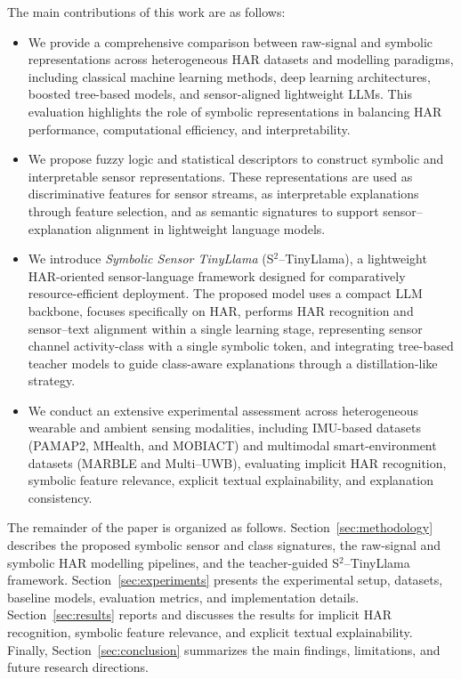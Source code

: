 \documentclass[preprint,12pt]{elsarticle}
\begin{document}
The main contributions of this work are as follows:
\begin{itemize}
    
    \item We provide a comprehensive comparison between raw-signal and symbolic representations across heterogeneous HAR datasets and modelling paradigms, including classical machine learning methods, deep learning architectures, boosted tree-based models, and sensor-aligned lightweight LLMs. This evaluation highlights the role of symbolic representations in balancing HAR performance, computational efficiency, and interpretability.

    \item We propose fuzzy logic and statistical descriptors to construct symbolic and interpretable sensor representations. These representations are used as discriminative features for sensor streams, as interpretable explanations through feature selection, and as semantic signatures to support sensor--explanation alignment in lightweight language models.
    
    \item We introduce \emph{Symbolic Sensor TinyLlama} (S$^2$--TinyLlama), a lightweight HAR-oriented sensor-language framework designed for comparatively resource-efficient deployment. The proposed model uses a compact LLM backbone, focuses specifically on HAR, performs HAR recognition and sensor--text alignment within a single learning stage, representing  sensor channel activity-class with a single symbolic token, and integrating tree-based teacher models to guide class-aware explanations through a distillation-like strategy.
    
    \item We conduct an extensive experimental assessment across heterogeneous wearable and ambient sensing modalities, including IMU-based datasets (PAMAP2, MHealth, and MOBIACT) and multimodal smart-environment datasets (MARBLE and Multi--UWB), evaluating implicit HAR recognition, symbolic feature relevance, explicit textual explainability, and explanation consistency.
\end{itemize}

The remainder of the paper is organized as follows. Section~\ref{sec:methodology} describes the proposed symbolic sensor and class signatures, the raw-signal and symbolic HAR modelling pipelines, and the teacher-guided S$^2$--TinyLlama framework. Section~\ref{sec:experiments} presents the experimental setup, datasets, baseline models, evaluation metrics, and implementation details. Section~\ref{sec:results} reports and discusses the results for implicit HAR recognition, symbolic feature relevance, and explicit textual explainability. Finally, Section~\ref{sec:conclusion} summarizes the main findings, limitations, and future research directions.
\end{document}
